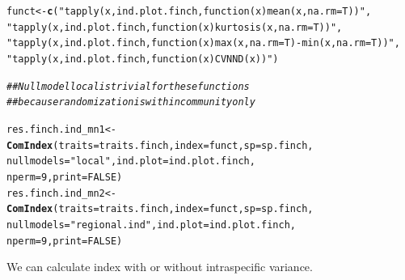 \documentclass[12pt]{article}\usepackage[]{graphicx}\usepackage[]{color}
\makeatletter
\newcommand{\hlnum}[1]{\textcolor[rgb]{0.686,0.059,0.569}{#1}}%
\newcommand{\hlstr}[1]{\textcolor[rgb]{0.192,0.494,0.8}{#1}}%
\newcommand{\hlcom}[1]{\textcolor[rgb]{0.678,0.584,0.686}{\textit{#1}}}%
\newcommand{\hlstd}[1]{\textcolor[rgb]{0.345,0.345,0.345}{#1}}%
\newcommand{\hlkwb}[1]{\textcolor[rgb]{0.69,0.353,0.396}{#1}}%
\newcommand{\hlkwc}[1]{\textcolor[rgb]{0.333,0.667,0.333}{#1}}%
\newcommand{\hlkwd}[1]{\textcolor[rgb]{0.737,0.353,0.396}{\textbf{#1}}}%
\newenvironment{kframe}{%
 \def\at@end@of@kframe{}%
 \ifinner\ifhmode%
  \def\at@end@of@kframe{\end{minipage}}%
  \begin{minipage}{\columnwidth}%
 \fi\fi%
 \def\FrameCommand##1{\hskip\@totalleftmargin \hskip-\fboxsep
 \colorbox{shadecolor}{##1}\hskip-\fboxsep
     \hskip-\linewidth \hskip-\@totalleftmargin \hskip\columnwidth}%
 \MakeFramed {\advance\hsize-\width
   \@totalleftmargin\z@ \linewidth\hsize
   \@setminipage}}%
 {\par\unskip\endMakeFramed%
 \at@end@of@kframe}
\newenvironment{knitrout}{}{} %
\makeatother
\begin{document}
\begin{knitrout}
\color{fgcolor}\begin{kframe}
\begin{alltt}
\hlstd{funct}\hlkwb{<-}\hlkwd{c}\hlstd{(}\hlstr{"tapply(x, ind.plot.finch, function(x) mean(x, na.rm = T))"}\hlstd{,}
     \hlstr{"tapply(x, ind.plot.finch, function(x) kurtosis(x, na.rm = T))"}\hlstd{,}
     \hlstr{"tapply(x, ind.plot.finch, function(x) max(x, na.rm = T)-min(x, na.rm = T))"}\hlstd{,}
     \hlstr{"tapply(x, ind.plot.finch, function(x) CVNND(x))"} \hlstd{)}

\hlcom{##Null model local is trivial for these functions}
\hlcom{##because randomization is within community only}

\hlstd{res.finch.ind_mn1}\hlkwb{<-}\hlkwd{ComIndex}\hlstd{(}\hlkwc{traits} \hlstd{= traits.finch,} \hlkwc{index} \hlstd{= funct,} \hlkwc{sp} \hlstd{= sp.finch,}
               \hlkwc{nullmodels} \hlstd{=} \hlstr{"local"}\hlstd{,} \hlkwc{ind.plot} \hlstd{= ind.plot.finch,}
               \hlkwc{nperm} \hlstd{=} \hlnum{9}\hlstd{,} \hlkwc{print} \hlstd{=} \hlnum{FALSE}\hlstd{)}
\hlstd{res.finch.ind_mn2}\hlkwb{<-}\hlkwd{ComIndex}\hlstd{(}\hlkwc{traits} \hlstd{= traits.finch,} \hlkwc{index} \hlstd{= funct,} \hlkwc{sp} \hlstd{= sp.finch,}
               \hlkwc{nullmodels} \hlstd{=} \hlstr{"regional.ind"}\hlstd{,} \hlkwc{ind.plot} \hlstd{= ind.plot.finch,}
               \hlkwc{nperm} \hlstd{=} \hlnum{9}\hlstd{,} \hlkwc{print} \hlstd{=} \hlnum{FALSE}\hlstd{)}
\end{alltt}
\end{kframe}
\end{knitrout}


We can calculate index with or without intraspecific variance.
\end{document}

